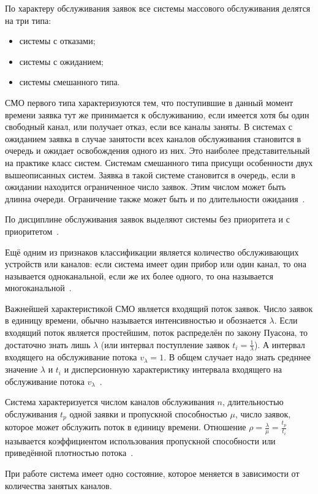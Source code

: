 По характеру обслуживания заявок все системы массового обслуживания делятся на три типа:
\begin{itemize}[label=---]
	\item системы с отказами;
	\item системы с ожиданием;
	\item системы смешанного типа.
\end{itemize}
СМО первого типа характеризуются тем, что поступившие в данный момент времени заявка тут же принимается к обслуживанию, если имеется хотя бы один свободный канал, или получает отказ, если все каналы заняты. В системах с ожиданием заявка в случае занятости всех каналов обслуживания становится в очередь и ожидает освобождения одного из них. Это наиболее представительный на практике класс систем. Системам смешанного типа присущи особенности двух вышеописанных систем. Заявка в такой системе становится в очередь, если в ожидании находится ограниченное число заявок. Этим числом может быть длинна очереди. Ограничение также может быть и по длительности ожидания~\cite{smo}.

По дисциплине обслуживания заявок выделяют системы без приоритета и с приоритетом~\cite{smo}.

Ещё одним из признаков классификации является количество обслуживающих устройств или каналов: если система имеет один прибор или один канал, то она называется одноканальной, если же их более одного, то она называется многоканальной~\cite{smo_chan}. 

Важнейшей характеристикой СМО является входящий поток заявок. Число заявок в единицу времени, обычно называется интенсивностью и обознается $\lambda$. Если входящий поток является простейшим, поток распределён по закону Пуасона, то достаточно знать лишь $\lambda$ (или интервал поступление заявок $t_i = \frac{1}{\lambda}$). А интервал входящего на обслуживание потока $v_\lambda = 1$. В общем случает надо знать средннее значение $\lambda$ и $t_i$ и дисперсионную характеристику интервала входящего на обслуживание потока $v_\lambda$~\cite{smo}.

Система характеризуется числом каналов обслуживания $n$, длительностью обслуживания $t_p$ одной заявки и пропускной способностью $\mu$, число заявок, которое может обслужить поток в единицу времени. Отношение $\rho = \frac{\lambda}{\mu} = \frac{t_p}{t_i}$ называется коэффициентом использования пропускной способности или приведённой плотностью потока~\cite{smo}. 

При работе система имеет одно состояние, которое меняется в зависимости от количества занятых каналов.

